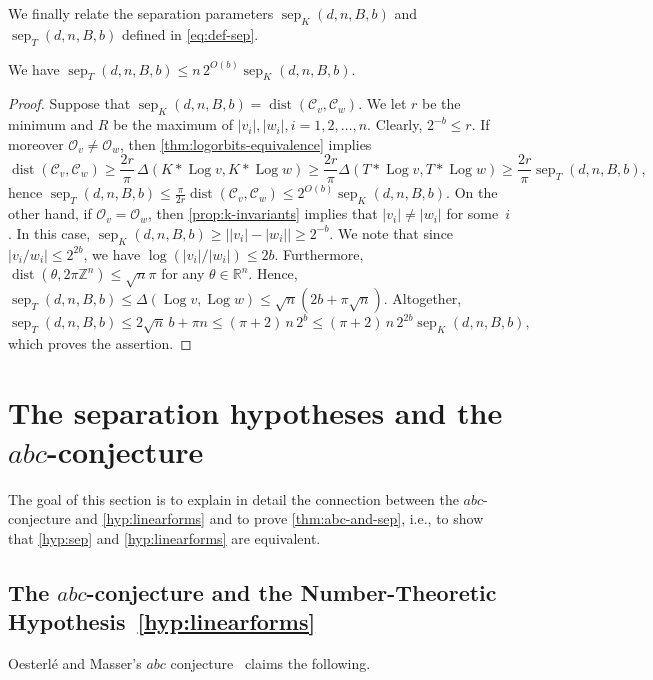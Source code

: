 \documentclass[a4paper,USenglish,cleveref,numberwithinsect]{lipics-v2021}
\DeclareMathOperator{\sep}{sep}
\DeclareMathOperator{\Log}{Log}
\DeclareMathOperator{\dist}{dist}
\newcommand{\ZZ}{\mathbb{Z}}
\newcommand{\RR}{\mathbb{R}}
\newcommand{\OO}{\ensuremath{\mathcal{O}}}
\newcommand{\KK}{\ensuremath{\mathcal{C}}}
\newcommand{\abc}{\texorpdfstring{$abc$}{abc}}
\numberwithin{equation}{section}
\begin{document}
We finally relate the separation parameters $\sep_K(d,n,B,b)$ and $\sep_T(d,n,B,b)$
defined in \cref{eq:def-sep}.

\begin{corollary}\label{cor:rel-btw-seps}
We have $\sep_T(d,n,B,b)\leq n\, 2^{O(b)}\sep_K(d,n,B,b)$.
\end{corollary}

\begin{proof}
Suppose that $\sep_K(d,n,B,b)= \dist(\KK_v,\KK_w)$.
We let $r$ be the minimum and $R$ be the maximum of $|v_i|,|w_i|, i=1,2,\dots,n$.
Clearly, $2^{-b} \le r$.
If moreover $\OO_v\neq\OO_w$, then
\cref{thm:logorbits-equivalence} implies
\[
 \dist(\KK_v,\KK_w)\geq \frac{2r}{\pi} \, \Delta(K\ast\Log v,K\ast\Log w)
    \geq \frac{2r}{\pi}\Delta(T\ast\Log v, T\ast\Log w)
     \geq \frac{2r}{\pi} \sep_T(d,n,B,b) ,
\]
hence
$\sep_T(d,n,B,b) \le \frac{\pi}{2r}\dist(\KK_v,\KK_w) \le 2^{O(b)} \sep_K(d,n,B,b)$.
On the other hand, if $\OO_v=\OO_w$, then \cref{prop:k-invariants} implies that $|v_i|\neq|w_i|$
for some~$i$. In this case,
$\sep_K(d,n,B,b) \ge\Big| |v_i| -|w_i| \Big|\ge 2^{-b}$.
We note that since $|v_i/w_i|\leq 2^{2b}$,  we have $\log(|v_i|/|w_i|)\leq 2b$. Furthermore, $\dist(\theta,2\pi\ZZ^n)\leq \sqrt{n}\pi$ for any $\theta\in\RR^n$. Hence,
$\sep_T(d,n,B,b)\le \Delta(\Log v, \Log w) \le  \sqrt{n}(2b+\pi \sqrt{n})$.
Altogether,
$$
 \sep_T(d,n,B,b)\le 2\sqrt{n}\, b + \pi n \le (\pi+2)\,n\, 2^b \le (\pi+2)\, n\, 2^{2b} \sep_K(d,n,B,b) ,
$$
which proves the assertion.
\end{proof}

\section{The separation hypotheses and the \abc-conjecture}\label{sec:abc}

The goal of this section is to explain in detail the connection between
the \abc-conjecture and \cref{hyp:linearforms} and to prove \cref{thm:abc-and-sep},
i.e., to show that
\cref{hyp:sep} and \cref{hyp:linearforms} are equivalent.


\subsection{The \abc-conjecture and the Number-Theoretic Hypothesis~\ref{hyp:linearforms}}\label{sec:abc-sec1}
Oesterl\'{e} and Masser's $abc$ conjecture~\cite[Conjecture 3]{oesterle} claims the following.
\end{document}
